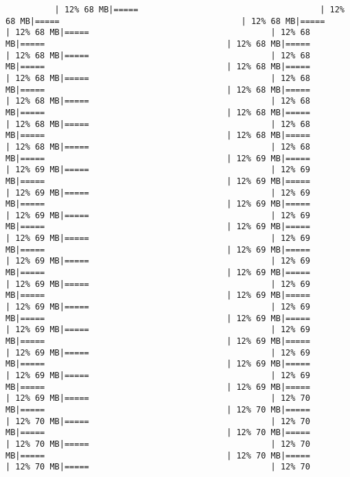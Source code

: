 \documentclass[
]{article}
\begin{document}
\begin{verbatim}
          | 12% 68 MB|=====                                     | 12% 68 MB|=====                                     | 12% 68 MB|=====                                     | 12% 68 MB|=====                                     | 12% 68 MB|=====                                     | 12% 68 MB|=====                                     | 12% 68 MB|=====                                     | 12% 68 MB|=====                                     | 12% 68 MB|=====                                     | 12% 68 MB|=====                                     | 12% 68 MB|=====                                     | 12% 68 MB|=====                                     | 12% 68 MB|=====                                     | 12% 68 MB|=====                                     | 12% 68 MB|=====                                     | 12% 68 MB|=====                                     | 12% 68 MB|=====                                     | 12% 68 MB|=====                                     | 12% 68 MB|=====                                     | 12% 68 MB|=====                                     | 12% 69 MB|=====                                     | 12% 69 MB|=====                                     | 12% 69 MB|=====                                     | 12% 69 MB|=====                                     | 12% 69 MB|=====                                     | 12% 69 MB|=====                                     | 12% 69 MB|=====                                     | 12% 69 MB|=====                                     | 12% 69 MB|=====                                     | 12% 69 MB|=====                                     | 12% 69 MB|=====                                     | 12% 69 MB|=====                                     | 12% 69 MB|=====                                     | 12% 69 MB|=====                                     | 12% 69 MB|=====                                     | 12% 69 MB|=====                                     | 12% 69 MB|=====                                     | 12% 69 MB|=====                                     | 12% 69 MB|=====                                     | 12% 69 MB|=====                                     | 12% 69 MB|=====                                     | 12% 69 MB|=====                                     | 12% 69 MB|=====                                     | 12% 69 MB|=====                                     | 12% 69 MB|=====                                     | 12% 69 MB|=====                                     | 12% 69 MB|=====                                     | 12% 69 MB|=====                                     | 12% 69 MB|=====                                     | 12% 69 MB|=====                                     | 12% 69 MB|=====                                     | 12% 69 MB|=====                                     | 12% 70 MB|=====                                     | 12% 70 MB|=====                                     | 12% 70 MB|=====                                     | 12% 70 MB|=====                                     | 12% 70 MB|=====                                     | 12% 70 MB|=====                                     | 12% 70 MB|=====                                     | 12% 70 MB|=====                                     | 12% 70 MB|=====                                     | 12% 70 
\end{verbatim}
\end{document}
